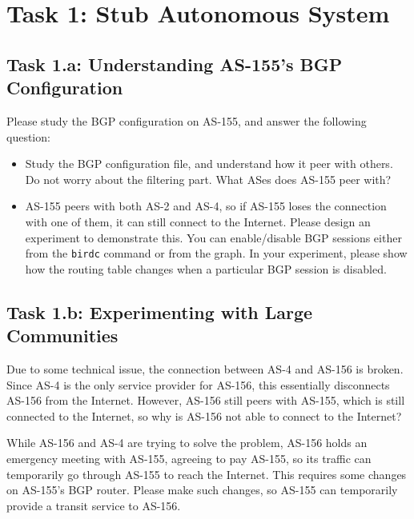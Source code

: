 \section{Task 1: Stub Autonomous System} 


\subsection{Task 1.a: Understanding AS-155's BGP Configuration} 

Please study the BGP configuration on AS-155, and answer the following question:

\begin{itemize}
  \item Study the BGP configuration file, and understand how it
    peer with others. Do not worry about the filtering part.
    What ASes does AS-155 peer with? 

  \item AS-155 peers with both AS-2 and AS-4, so if AS-155
    loses the connection with one of them, it can still connect
    to the Internet. Please design an experiment to 
    demonstrate this. You can enable/disable BGP sessions
    either from the \texttt{birdc} command or from the 
    graph. In your experiment, please show 
    how the routing table changes when a particular 
    BGP session is disabled. 
\end{itemize}



\subsection{Task 1.b: Experimenting with Large Communities} 

Due to some technical issue, the connection between AS-4 and AS-156 is broken. 
Since AS-4 is the only service provider for AS-156, this essentially
disconnects AS-156 from the Internet. However, AS-156 still peers with AS-155, 
which is still connected to the Internet, so why is AS-156 not able to 
connect to the Internet?  

While AS-156 and AS-4 are trying to solve the problem, AS-156 holds an 
emergency meeting with AS-155, agreeing to pay AS-155, so its 
traffic can temporarily go through AS-155 to reach the Internet. 
This requires some changes on AS-155's BGP router. 
Please make such changes, so AS-155 can temporarily 
provide a transit service to AS-156.


